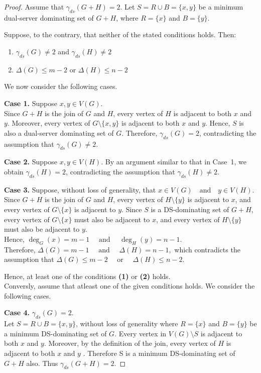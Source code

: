 \documentclass{article}
\begin{document}
\begin{proof}
Assume that $\gamma_{ds}(G+H)=2$.
Let $S= R \cup B= \{x,y\}$
be a minimum dual-server dominating set of $G+H$, where $
R=\{x\}$ and $B=\{y\}$.

Suppose, to the contrary,  that neither of the stated conditions holds. Then: 
\begin{enumerate}
\item{$\gamma_{ds}(G)\neq 2$} and {$\gamma_{ds}(H)\neq 2$}
\item{$\Delta(G)\le m-2$ or 
$\Delta(H)\le n-2$
}
\end{enumerate}
We now consider the following cases.

\textbf{Case 1.} Suppose $x,y\in V(G)$.\\
Since $G+H$ is the join of $G$ and $H$, every vertex of $H$ is adjacent to
both $x$ and $y$. Moreover, every vertex of $G\setminus\{x,y\}$ is adjacent
to both $x$ and $y$. Hence, $S$ is also a dual-server dominating set of $G$.
Therefore,
$\gamma_{ds}(G)=2$,
contradicting the assumption that $
\gamma_{ds}(G)\neq 2$.

\textbf{Case 2.} Suppose $x,y\in V(H)$.
By an argument similar to that in Case~1, we obtain $
\gamma_{ds}(H)=2$,
contradicting the assumption that $\gamma_{ds}(H)\neq 2$.

\textbf{Case 3.} Suppose, without loss of generality, that $x\in V(G)\quad\text{and}\quad y\in V(H)$.
Since $G+H$ is the join of $G$ and $H$, every vertex of
$H\setminus\{y\}$ is adjacent to $x$, and every vertex of
$G\setminus\{x\}$ is adjacent to $y$.
Since $S$ is a  DS-dominating set of $G+H$, every vertex of
$G\setminus\{x\}$ must also be adjacent to $x$, and every vertex of
$H\setminus\{y\}$ must also be adjacent to $y$.\\
Hence, $
\deg_G(x)=m-1 \quad\text{ and }\quad  \deg_H(y)=n-1 $.\\
Therefore, $
\Delta(G)=m-1
\quad\text{ and }\quad
\Delta(H)=n-1,$
which contradicts the assumption that $
\Delta(G)\le m-2
\quad\text{ or }\quad
\Delta(H)\le n-2.$

Hence, at least one of the conditions \textbf{(1)} or \textbf{(2)} holds.\\ 
Conversly, assume that atleast one of the given conditions holds. We consider the following cases.

\textbf{Case 4.} $\gamma_{ds}(G)= 2$.\\ Let $S= R \cup B= \{x, y\}$, without loss of generality where $R= \{x\}$ and $B= \{y\}$ be a minimum  DS-dominating set of $G$. Every vertex in $V(G)\setminus S$ is adjacent to both $x$ and $y$. Moreover, by the definition of the join, every vertex of $H$ is adjacent to both $x$ and $y$ . Therefore S is a minimum  DS-dominating set of $G+H$ also. Thus $\gamma_{ds}(G+H)= 2$. 


\end{proof}
\end{document}
